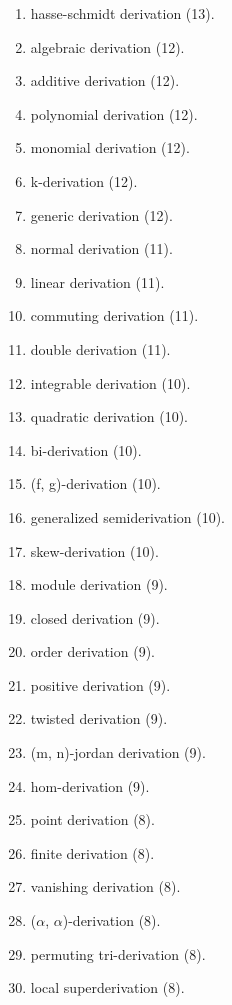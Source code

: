 \begin{enumerate}
\item \allowbreak hasse-schmidt derivation \hfill(13).
\item \allowbreak algebraic derivation \hfill(12).
\item \allowbreak additive derivation \hfill(12).
\item \allowbreak polynomial derivation \hfill(12).
\item \allowbreak monomial derivation \hfill(12).
\item \allowbreak k-derivation \hfill(12).
\item \allowbreak generic derivation \hfill(12).
\item \allowbreak normal derivation \hfill(11).
\item \allowbreak linear derivation \hfill(11).
\item \allowbreak commuting derivation \hfill(11).
\item \allowbreak double derivation \hfill(11).
\item \allowbreak integrable derivation \hfill(10).
\item \allowbreak quadratic derivation \hfill(10).
\item \allowbreak bi-derivation \hfill(10).
\item \allowbreak (f, g)-derivation \hfill(10).
\item \allowbreak generalized semiderivation \hfill(10).
\item \allowbreak skew-derivation \hfill(10).
\item \allowbreak module derivation \hfill(9).
\item \allowbreak closed derivation \hfill(9).
\item \allowbreak order derivation \hfill(9).
\item \allowbreak positive derivation \hfill(9).
\item \allowbreak twisted derivation \hfill(9).
\item \allowbreak (m, n)-jordan derivation \hfill(9).
\item \allowbreak hom-derivation \hfill(9).
\item \allowbreak point derivation \hfill(8).
\item \allowbreak finite derivation \hfill(8).
\item \allowbreak vanishing derivation \hfill(8).
\item \allowbreak ($\alpha$, $\alpha$)-derivation \hfill(8).
\item \allowbreak permuting tri-derivation \hfill(8).
\item \allowbreak local superderivation \hfill(8).

\end{enumerate}
